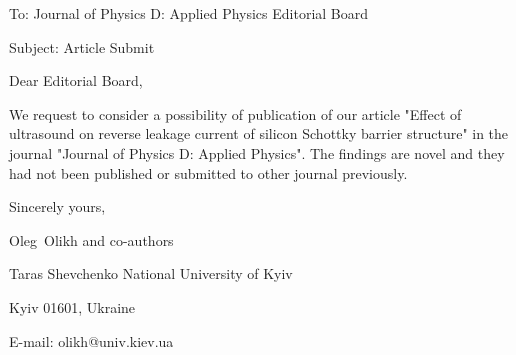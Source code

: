 \documentclass[preprint]{elsarticle}
\begin{document}
To:
Journal of Physics D: Applied Physics Editorial Board


Subject:
Article Submit

\vspace{5mm}
Dear Editorial Board,

\vspace{3mm}
We request to consider a possibility of publication of our article "Effect of ultrasound on  reverse leakage current of silicon Schottky barrier structure" in the journal "Journal of Physics D: Applied Physics".
The findings are novel and they had not been published or submitted to other journal previously.


\vspace{3mm}

Sincerely yours,

Oleg~Olikh and co-authors


Taras Shevchenko National University of Kyiv


Kyiv 01601, Ukraine

E-mail: olikh@univ.kiev.ua
\end{document}
